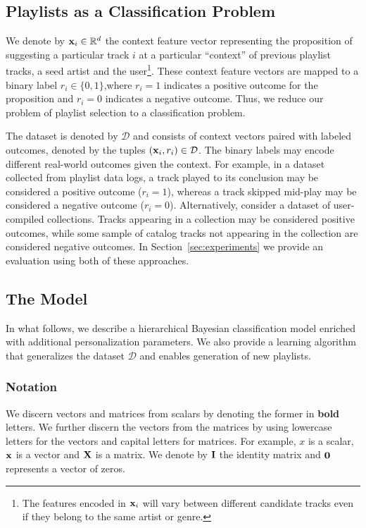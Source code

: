 

\subsection{Playlists as a Classification Problem}
\label{sec:playlist_is_classification}
We denote by $\mathbf{x}_i \in \mathbb{R}^d$ the context feature vector representing the proposition of suggesting a particular track $i$ at a particular ``context'' of previous playlist tracks, a seed artist and the user\footnote{The features encoded in $\mathbf{x}_i$  will vary between different candidate tracks even if they belong to the same artist or genre.}.  These context feature vectors are mapped to a binary label $r_i \in \{0,1\}$,where $r_i=1$ indicates a positive outcome for the proposition and $r_i=0$ indicates a negative outcome. Thus, we reduce our problem of playlist selection to a classification problem.

The dataset is denoted by $\mathcal{D}$ and consists of context vectors paired with labeled outcomes, denoted by the tuples $\left(\mathbf{x}_i,r_i\right) \in \mathcal{D}$.
The binary labels may encode different real-world outcomes  given the context. 
For example, in a dataset collected from playlist data logs, a track  played to its conclusion may be considered a positive outcome ($r_i=1$), whereas a track  skipped  mid-play may be considered a negative outcome ($r_i=0$). Alternatively, consider a dataset of user-compiled collections. Tracks appearing in a collection may be considered positive outcomes, while some sample of catalog tracks not appearing in the collection are considered negative outcomes.  In Section~\ref{sec:experiments} we provide an evaluation using both of these approaches. 


\subsection{The Model}
In what follows, we describe a  hierarchical Bayesian classification model enriched with additional personalization parameters. We also provide a learning algorithm that generalizes the dataset $\mathcal{D}$ and enables generation of new playlists.

\subsubsection{Notation}
We discern vectors and matrices from scalars by denoting the former in {\bf bold} letters. We further discern the vectors from the matrices by using lowercase letters for the vectors and capital letters for matrices. For example, $x$ is a scalar, $\mathbf{x}$ is a vector and $\mathbf{X}$ is a matrix. We denote by $\mathbf{I}$ the identity matrix and $\mathbf{0}$ represents a vector of zeros. 


